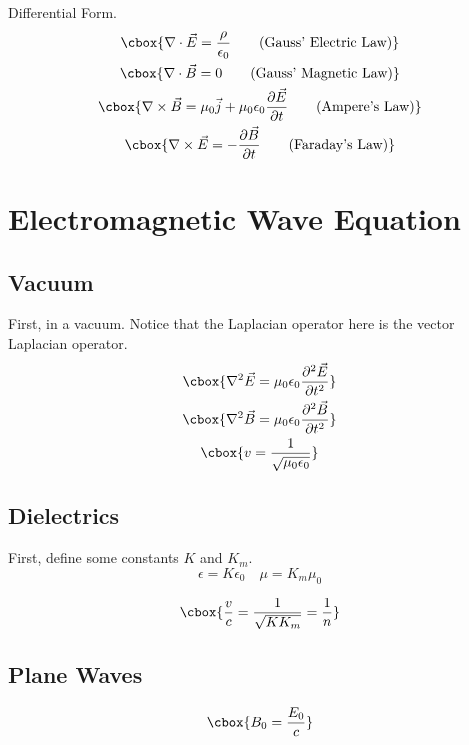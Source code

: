 \documentclass{hw}
\numberwithin{equation}{section}
\begin{document}
Differential Form.
\begin{gather}
  \cbox{\nabla \cdot  \vec{E} = \frac{\rho}{\epsilon_0}
    \tag{Gauss' Electric Law}} \\
  \cbox{\nabla \cdot  \vec{B} = 0
    \tag{Gauss' Magnetic Law}} \\
  \cbox{\nabla \times \vec{B} = \mu_0 \vec{j} + \mu_0 \epsilon_0 \frac{\partial \vec{E}}{\partial t} 
    \tag{Ampere's Law}}        \\
  \cbox{\nabla \times \vec{E} = - \frac{\partial \vec{B}}{\partial t}
    \tag{Faraday's Law}}
\end{gather}

\section{Electromagnetic Wave Equation}
\subsection{Vacuum}
First, in a vacuum. Notice that the Laplacian operator here is the vector
Laplacian operator. 
\begin{gather}
  \cbox{\nabla^2 \vec{E} = \mu_0 \epsilon_0 \frac{\partial^2 \vec{E}}{\partial t^2}} \\
  \cbox{\nabla^2 \vec{B} = \mu_0 \epsilon_0 \frac{\partial^2 \vec{B}}{\partial t^2}} \\
  \cbox{v = \frac{1}{\sqrt{\mu_0 \epsilon_0}}}
\end{gather}

\subsection{Dielectrics}
First, define some constants $K$ and $K_m$.
\begin{equation}
  \epsilon = K \epsilon_0 \quad \mu = K_m \mu_0
\end{equation}

\begin{equation}
  \cbox{\frac{v}{c} = \frac{1}{\sqrt{KK_m}} = \frac{1}{n}}
\end{equation}

\subsection{Plane Waves}
\begin{equation}
  \cbox{B_0 = \frac{E_0}{c}}
\end{equation}
\end{document}
